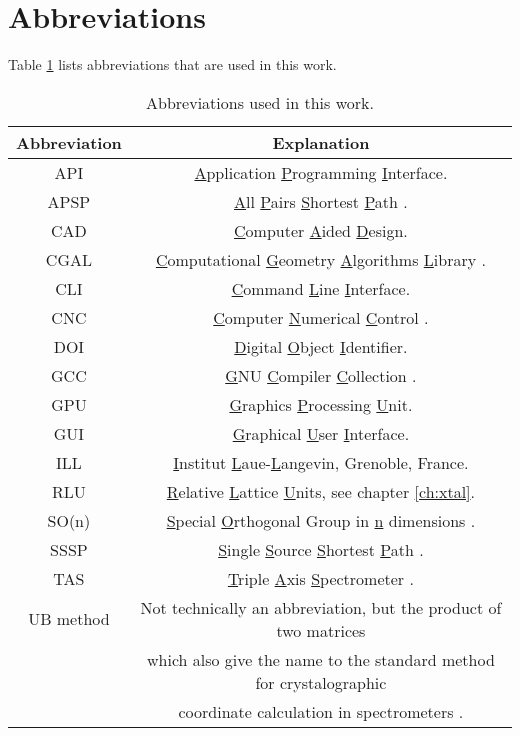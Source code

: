 \section{Abbreviations}
Table \ref{tab:abbreviations} lists abbreviations that are used in this work.

\begin{table}[htb]
	\centering
	\begin{tabular}{|c|c|}
		\hline
		\bf{Abbreviation} & \bf{Explanation} \tabularnewline
		\hline
		API		 & \underline{A}pplication \underline{P}rogramming \underline{I}nterface. \tabularnewline
		\hline
		APSP		 & \underline{A}ll \underline{P}airs \underline{S}hortest \underline{P}ath \cite[pp. 309-320]{Erickson2019}. \tabularnewline
		\hline
		CAD              & \underline{C}omputer \underline{A}ided \underline{D}esign. \tabularnewline
		\hline
		CGAL             & \underline{C}omputational \underline{G}eometry \underline{A}lgorithms \underline{L}ibrary \cite{web_cgal}. \tabularnewline
		\hline
		CLI              & \underline{C}ommand \underline{L}ine \underline{I}nterface. \tabularnewline
		\hline
		CNC              & \underline{C}omputer \underline{N}umerical \underline{C}ontrol \cite{wiki_milling}. \tabularnewline
		\hline
		DOI              & \underline{D}igital \underline{O}bject \underline{I}dentifier. \tabularnewline
		\hline
		GCC              & \underline{G}NU \underline{C}ompiler \underline{C}ollection \cite{web_gcc}. \tabularnewline
		\hline
		GPU              & \underline{G}raphics \underline{P}rocessing \underline{U}nit. \tabularnewline
		\hline
		GUI              & \underline{G}raphical \underline{U}ser \underline{I}nterface. \tabularnewline
		\hline
		ILL              & \underline{I}nstitut \underline{L}aue-\underline{L}angevin, Grenoble, France. \tabularnewline
		\hline
		RLU              & \underline{R}elative \underline{L}attice \underline{U}nits, see chapter \ref{ch:xtal}. \tabularnewline
		\hline
		SO(n)            & \underline{S}pecial \underline{O}rthogonal Group in \underline{n} dimensions \cite[pp. 849-851]{Arfken2013}. \tabularnewline
		\hline
		SSSP		 & \underline{S}ingle \underline{S}ource \underline{S}hortest \underline{P}ath \cite[pp. 273-297]{Erickson2019}. \tabularnewline
		\hline
		TAS              & \underline{T}riple \underline{A}xis \underline{S}pectrometer \cite{Shirane2002}. \tabularnewline
		\hline
		UB method        & Not technically an abbreviation, but the product of two matrices \tabularnewline
		                          & which also give the name to the standard method for crystalographic \tabularnewline
		                          & coordinate calculation in spectrometers \cite{Lumsden2005}. \tabularnewline
		\hline
	\end{tabular}
	\caption[Abbreviations.]{Abbreviations used in this work.}
	\label{tab:abbreviations}
\end{table}
